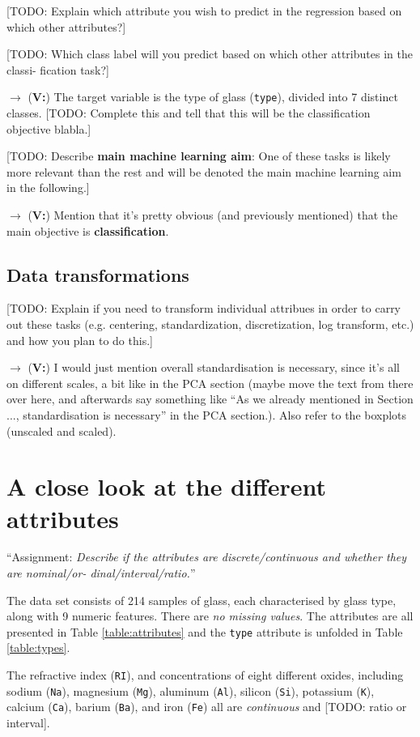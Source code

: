 \documentclass[dtu]{dtuarticle}
\newcommand{\todo}[1]{\color{red}[TODO: #1]\color{black}}
\begin{document}
	\todo{Explain which attribute you wish to predict in the regression based on which
		other attributes?}

	\todo{Which class label will you predict based on which other attributes in the classi-
		fication task?}

	\(\rightarrow\) (\textbf{V:}) The target variable is the type of glass (\texttt{type}), divided into 7 distinct classes. \todo{Complete this and tell that this will be the classification objective blabla.}

	\todo{Describe \textbf{main machine learning aim}: One of these tasks is likely more relevant than the rest and will be denoted the main machine learning aim in the following.}

	\(\rightarrow\) (\textbf{V:}) Mention that it's pretty obvious (and previously mentioned) that the main objective is \textbf{classification}.

	\subsection{Data transformations}

	\todo{Explain if you need to transform individual attribues in order to carry out these
		tasks (e.g. centering, standardization, discretization, log transform, etc.) and
		how you plan to do this.}

	\(\rightarrow\) (\textbf{V:}) I would just mention overall standardisation is necessary, since it's all on different scales, a bit like in the PCA section (maybe move the text from there over here, and afterwards say something like ``As we already mentioned in Section ..., standardisation is necessary'' in the PCA section.). Also refer to the boxplots (unscaled and scaled).

	\section{A close look at the different attributes}

	``Assignment: \textit{Describe if the attributes are discrete/continuous and whether they are nominal/or-
		dinal/interval/ratio.}''

	The data set consists of 214 samples of glass, each characterised by glass type, along with 9 numeric features. There are \textit{no missing values}. The attributes are all presented in Table \ref{table:attributes} and the \texttt{type} attribute is unfolded in Table \ref{table:types}.

	The refractive index (\texttt{RI}), and concentrations of eight different oxides, including sodium (\texttt{Na}), magnesium (\texttt{Mg}), aluminum (\texttt{Al}), silicon (\texttt{Si}), potassium (\texttt{K}), calcium (\texttt{Ca}), barium (\texttt{Ba}), and iron (\texttt{Fe}) all are \textit{continuous} and \todo{ratio or interval}.
\end{document}
